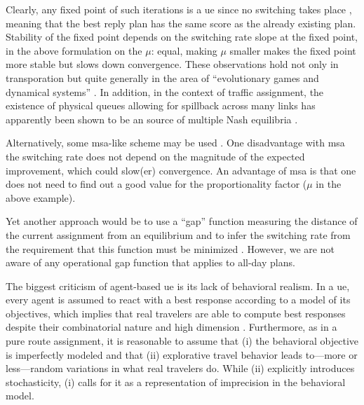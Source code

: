 Clearly, any fixed point of such iterations is a \gls{ue}\corr{,}{} since no switching takes place ,
meaning that the best reply plan has the same score as the already existing plan.  
%
Stability of the fixed point depends on the switching rate slope 
at the fixed point, in the above formulation on the $\mu$:  equal, making $\mu$ smaller makes the fixed point more
stable\corr{,}{} but slows down convergence. 
%
These observations hold not only in transporation
\citep[e.g.,][]{watling-2003}\corr{,}{} but quite generally in the area of
``evolutionary games and dynamical systems'' \citep{HofbSigmBook}. 
%
In addition, in the context of
traffic assignment, the existence of physical queues allowing for 
spillback across many links has apparently been shown to be an
 source of multiple Nash equilibria
\citep[][]{daganzo-1998}.

Alternatively, some \gls{msa}-like scheme
may be used \citep{liu-2007}.
One disadvantage\corr{:} with \gls{msa} the
switching rate does not depend on the magnitude of the expected
improvement, which could  slow(er) convergence.  An advantage
of \gls{msa} is that one does not need to find out a good value for the
proportionality factor ($\mu$ in the above example).  

Yet another approach would be to use a ``gap'' function measuring the
distance of the current assignment from an equilibrium and to infer
the switching rate from the requirement that this function must
be minimized 
\citep{LuMahmassaniZhou2009GapDue,zhang-2008}.
However, we are not aware of any operational gap function that applies to all-day plans.

The biggest criticism of agent-based \gls{ue} is its lack of behavioral realism.
In a \gls{ue}, every agent is assumed to react with a best response 
according to a model of its objectives, which implies 
that real travelers are able to compute best responses
despite their combinatorial nature and high dimension
\citep{bowman-1998}.
Furthermore, as in a pure route assignment, it
is reasonable to assume that (i) the behavioral objective is
imperfectly modeled and that (ii) explorative travel behavior leads
to---more or less---random variations in what real travelers do.
While (ii) explicitly introduces stochasticity, (i) calls for it as a
representation of imprecision in the behavioral model.

